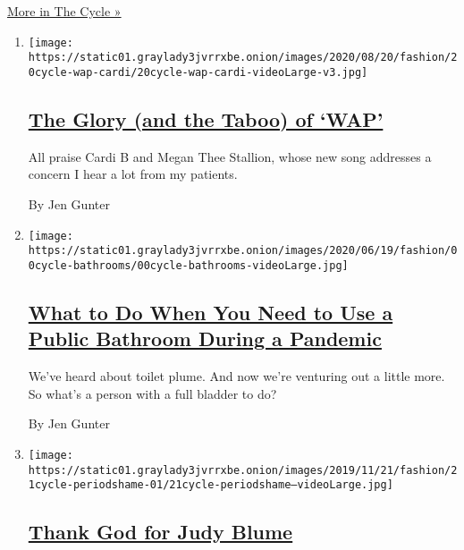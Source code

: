 \href{/column/the-cycle}{More in The Cycle »}

\begin{enumerate}
\def\labelenumi{\arabic{enumi}.}
\item
  \texttt{[image: https://static01.graylady3jvrrxbe.onion/images/2020/08/20/fashion/20cycle-wap-cardi/20cycle-wap-cardi-videoLarge-v3.jpg]}

  \hypertarget{the-glory-and-the-taboo-of-wap}{%
  \subsection{\texorpdfstring{\href{/2020/08/18/style/wap-cardi-b.html}{The
  Glory (and the Taboo) of
  `WAP'}}{The Glory (and the Taboo) of `WAP'}}\label{the-glory-and-the-taboo-of-wap}}

  All praise Cardi B and Megan Thee Stallion, whose new song addresses a
  concern I hear a lot from my patients.

  By Jen Gunter
\item
  \texttt{[image: https://static01.graylady3jvrrxbe.onion/images/2020/06/19/fashion/00cycle-bathrooms/00cycle-bathrooms-videoLarge.jpg]}

  \hypertarget{what-to-do-when-you-need-to-use-a-public-bathroom-during-a-pandemic}{%
  \subsection{\texorpdfstring{\href{/2020/06/24/style/coronavirus-public-bathrooms.html}{What
  to Do When You Need to Use a Public Bathroom During a
  Pandemic}}{What to Do When You Need to Use a Public Bathroom During a Pandemic}}\label{what-to-do-when-you-need-to-use-a-public-bathroom-during-a-pandemic}}

  We've heard about toilet plume. And now we're venturing out a little
  more. So what's a person with a full bladder to do?

  By Jen Gunter
\item
  \texttt{[image: https://static01.graylady3jvrrxbe.onion/images/2019/11/21/fashion/21cycle-periodshame-01/21cycle-periodshame--videoLarge.jpg]}

  \hypertarget{thank-god-for-judy-blume}{%
  \subsection{\texorpdfstring{\href{/2019/11/21/style/menstrual-diarrhea-happens.html}{Thank
  God for Judy
  Blume}}{Thank God for Judy Blume}}\label{thank-god-for-judy-blume}}


\end{enumerate}
